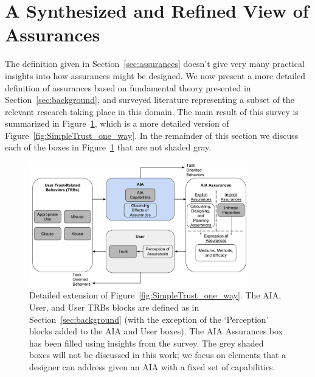 \section{A Synthesized and Refined View of Assurances} \label{sec:synthesis}
    The definition given in Section~\ref{sec:assurances} doesn't give very many practical insights into how assurances might be designed. We now present a more detailed definition of assurances based on fundamental theory presented in Section~\ref{sec:background}, and surveyed literature representing a subset of the relevant research taking place in this domain. The main result of this survey is summarized in Figure~\ref{fig:refined_assurances}, which is a more detailed version of Figure~\ref{fig:SimpleTrust_one_way}. In the remainder of this section we discuss each of the boxes in Figure~\ref{fig:refined_assurances} that are not shaded gray.

    \begin{figure}[htbp]
        \centering
        \includegraphics[width=0.85\textwidth]{Figures/RefinedTrust_one_way}
        \caption{Detailed extension of Figure~\ref{fig:SimpleTrust_one_way}. The AIA, User, and User TRBs blocks are defined as in Section~\ref{sec:background} (with the exception of the `Perception' blocks added to the AIA and User boxes). The AIA Assurances box has been filled using insights from the survey. The grey shaded boxes will not be discussed in this work; we focus on elements that a designer can address given an AIA with a fixed set of capabilities.}
        \label{fig:refined_assurances}
    \end{figure}






